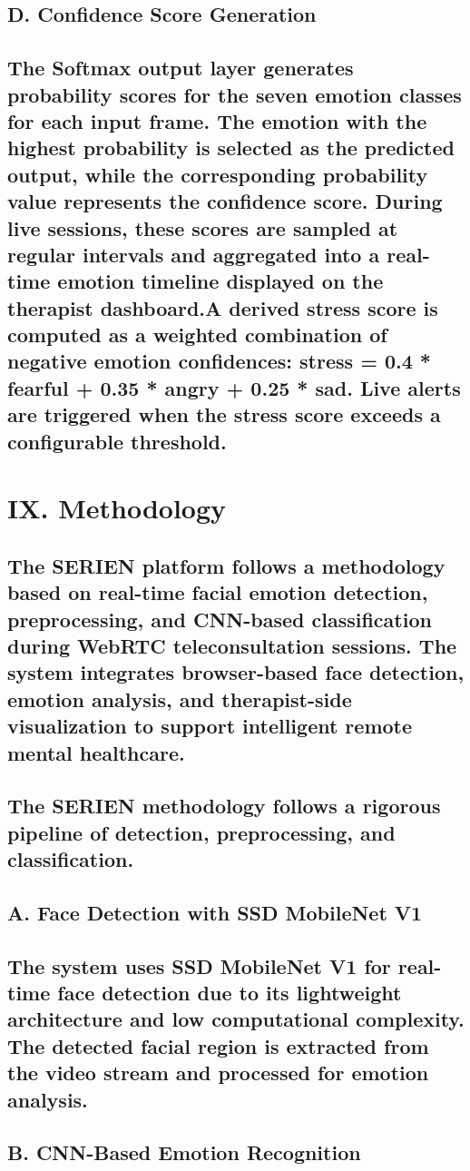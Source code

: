 \documentclass[conference]{IEEEtran}
\begin{document}
\subsection{D. Confidence Score Generation}
\subsection{The Softmax output layer generates probability scores for the seven emotion classes for each input frame. The emotion with the highest probability is selected as the predicted output, while the corresponding probability value represents the confidence score. During live sessions, these scores are sampled at regular intervals and aggregated into a real-time emotion timeline displayed on the therapist dashboard.A derived stress score is computed as a weighted combination of negative emotion confidences: stress = 0.4 * fearful + 0.35 * angry + 0.25 * sad. Live alerts are triggered when the stress score exceeds a configurable threshold.}
\section{IX. Methodology}
\subsection{The SERIEN platform follows a methodology based on real-time facial emotion detection, preprocessing, and CNN-based classification during WebRTC teleconsultation sessions. The system integrates browser-based face detection, emotion analysis, and therapist-side visualization to support intelligent remote mental healthcare.}
\subsection{The SERIEN methodology follows a rigorous pipeline of detection, preprocessing, and classification.}
\subsection{A. Face Detection with SSD MobileNet V1}
\subsection{The system uses SSD MobileNet V1 for real-time face detection due to its lightweight architecture and low computational complexity. The detected facial region is extracted from the video stream and processed for emotion analysis.}
\subsection{B. CNN-Based Emotion Recognition}
\end{document}
